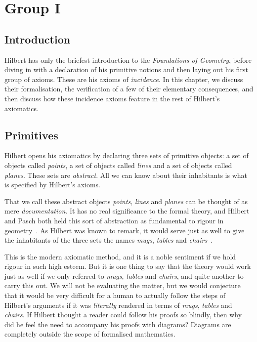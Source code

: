 \chapter{Group I}\label{chapter:Group1}

\section{Introduction}
Hilbert has only the briefest introduction to the \emph{Foundations of Geometry}, before diving in with a declaration of his primitive notions and then laying out his first group of axioms. These are his axioms of \emph{incidence}. In this chapter, we discuss their formalisation, the verification of a few of their elementary consequences, and then discuss how these incidence axioms feature in the rest of Hilbert's axiomatics.

\section{Primitives}
Hilbert opens his axiomatics by declaring three sets of primitive objects: a set of objects called \emph{points}, a set of objects called \emph{lines} and a set of objects called \emph{planes}. These sets are \emph{abstract}. All we can know about their inhabitants is what is specified by Hilbert's axioms. 

That we call these abstract objects \emph{points}, \emph{lines} and \emph{planes} can be thought of as mere \emph{documentation}. It has no real significance to the formal theory, and Hilbert and Pasch both held this sort of abstraction as fundamental to rigour in geometry~\cite{TableChairMug}. As Hilbert was known to remark, it would serve just as well to give the inhabitants of the three sets the names \emph{mugs}, \emph{tables} and \emph{chairs}~\cite{PaschToPeano}. 

This is the modern axiomatic method, and it is a noble sentiment if we hold rigour in such high esteem. But it is one thing to say that the theory would work just as well if we only referred to \emph{mugs}, \emph{tables} and \emph{chairs}, and quite another to carry this out. We will not be evaluating the matter, but we would conjecture that it would be very difficult for a human to actually follow the steps of Hilbert's arguments if it was \emph{literally} rendered in terms of \emph{mugs}, \emph{tables} and \emph{chairs}. If Hilbert thought a reader could follow his proofs so blindly, then why did he feel the need to accompany his proofs with diagrams? Diagrams are completely outside the scope of formalised mathematics.

